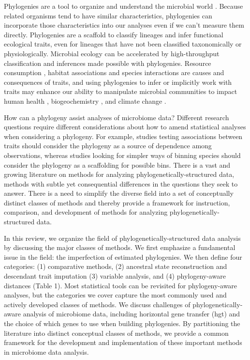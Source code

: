 Phylogenies are a tool to organize and understand the microbial world\cite{martiny_phylogenetic_microbiome} \cite{hug_tree_of_life}. Because related organisms tend to have similar characteristics, phylogenies can incorporate those characteristics into our analyses even if we can't measure them directly. Phylogenies are a scaffold to classify lineages and infer functional ecological traits, even for lineages that have not been classified taxonomically or physiologically. Microbial ecology can be accelerated by high-throughput classification and inferences made possible with phylogenies. Resource consumption \cite{tilman_resouce_competition}, habitat associations\cite{macarthur_bird_diversity} and species interactions\cite{may_ecosystem_stability}\cite{arditi_species_interact} are causes and consequences of traits, and using phylogenies to infer or implicitly work with traits may enhance our ability to manipulate microbial communities to impact human health \cite{hmp_structure}, biogeochemistry \cite{falkowski_microbial_chemistry}, and climate change \cite{bardgett_microbial_climate}.\par
How can a phylogeny assist analyses of microbiome data? Different research questions require different considerations about how to amend statistical analyses when considering a phylogeny. For example, studies testing associations between traits should consider the phylogeny as a source of dependence among observations, whereas studies looking for simpler ways of binning species should consider the phylogeny as a scaffolding for possible bins. There is a vast and growing literature on methods for analyzing phylogenetically-structured data, methods with subtle yet consequential differences in the questions they seek to answer. There is a need to simplify the diverse field into a set of conceptually distinct classes of methods and thereby provide a framework for instruction, comparison, and development of methods for analyzing phylogenetically-structured data.\par
In this review, we organize the field of phylogenetically-structured data analysis by discussing the major classes of methods. We first emphasize a fundamental issue in the field: the imperfection of estimated phylogenies. We then define four categories: (1) comparative methods, (2) ancestral state reconstruction and descendant trait imputation (3) variable analysis, and (4) phylogeny-aware distances (Table 1). Most statistical tools can be revisited for phylogeny-aware analyses, but the categories we cover capture the most commonly used and actively developed classes of methods. We discuss challenges of phylogenetically-aware analysis of microbiome data, including horizontal gene transfer (\gls{hgt}) and the choice of which genes to use when building phylogenies. By partitioning the literature into distinct conceptual classes of methods, we provide a common framework for the development and implementation of these important methods in microbiome data analysis.

